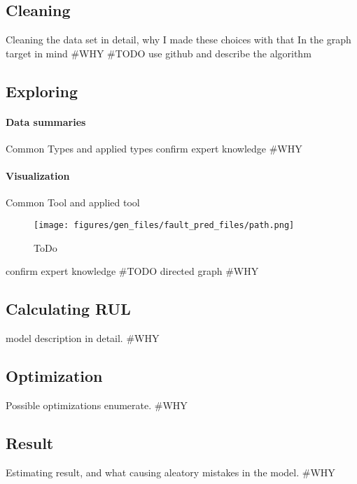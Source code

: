 	\subsection{Cleaning}
Cleaning the data set in detail, why I made these choices with that In the graph target in mind
\#WHY
		\#TODO use github and describe the algorithm
	\subsection{Exploring}
		\paragraph{Data summaries}
		Common Types and applied types
		confirm expert knowledge
		\#WHY
		\paragraph{Visualization}
		Common Tool and applied tool
			\begin{figure}[H]
			\centering
			\texttt{[image: figures/gen\_files/fault\_pred\_files/path.png]}
			\caption{ToDo} 
			\end{figure}
		confirm expert knowledge
		\#TODO directed graph
\#WHY
	\subsection{Calculating RUL}
model description in detail.
\#WHY
	\subsection{Optimization}
Possible optimizations enumerate.
\#WHY
	\subsection{Result}
Estimating result, and what causing aleatory mistakes in the model. 
\#WHY
\cite{GitHub_FP_RUL}